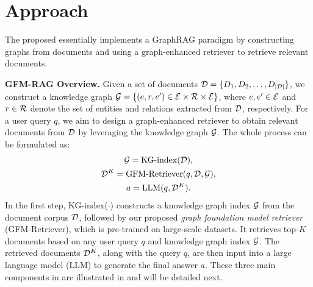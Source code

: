 \section{Approach}\label{sec:approach}

The proposed \ourmethod essentially implements a GraphRAG paradigm by constructing graphs from documents and using a graph-enhanced retriever to retrieve relevant documents.

\noindent\textbf{GFM-RAG Overview.}
Given a set of documents ${\mathcal{D}}=\{D_1,D_2,\ldots,D_{|{\mathcal{D}}|}\}$, we construct a knowledge graph ${\mathcal{G}}=\{(e,r,e')\in {\mathcal{E}}\times{\mathcal{R}}\times{\mathcal{E}}\}$, where $e,e'\in{\mathcal{E}}$ and $r\in{\mathcal{R}}$ denote the set of entities and relations extracted from ${\mathcal{D}}$, respectively. 
%
For a user query $q$, we aim to design a graph-enhanced retriever to obtain relevant documents from ${\mathcal{D}}$ by leveraging the knowledge graph ${\mathcal{G}}$. The whole \ourmethod process can be formulated as:
\begin{gather}
    {\mathcal{G}} = \text{KG-index}({\mathcal{D}}), \\ {\mathcal{D}}^K = \text{GFM-Retriever}(q,{\mathcal{D}},{\mathcal{G}}),\\
    a = \text{LLM}(q,{\mathcal{D}}^K).
\end{gather}
In the first step, KG-index($\cdot$)  constructs a knowledge graph index ${\mathcal{G}}$ from the document corpus ${\mathcal{D}}$, followed by our proposed \emph{graph foundation model retriever} (GFM-Retriever), which is pre-trained on large-scale datasets. It retrieves top-$K$ documents based on any user query $q$ and knowledge graph index ${\mathcal{G}}$. The retrieved documents ${\mathcal{D}}^K$, along with the query $q$, are then input into a large language model (LLM) to generate the final answer $a$.
%
These three main components in \ourmethod are illustrated in  and will be detailed next.

